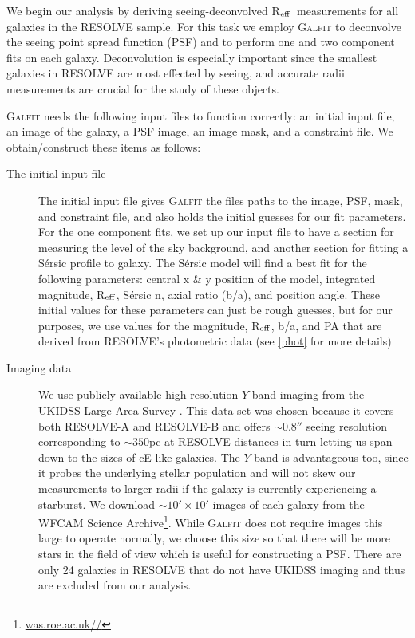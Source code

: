 \documentclass[iop,apj]{emulateapj}
\newcommand{\Reff}{R$_{\rm eff}$}
\begin{document}
\noindent We begin our analysis by deriving seeing-deconvolved \Reff\ measurements for all galaxies in the RESOLVE sample. For this task we employ \textsc{Galfit} \citep{Peng2002} to deconvolve the seeing point spread function (PSF) and to perform one and two component fits on each galaxy. Deconvolution is especially important since the smallest galaxies in RESOLVE are most effected by seeing, and accurate radii measurements are crucial for the study of these objects. 

\textsc{Galfit} needs the following input files to function correctly: an initial input file, an image of the galaxy, a PSF image, an image mask, and a constraint file. We obtain/construct these items as follows:

\begin{description}

\item[The initial input file]{The initial input file gives \textsc{Galfit} the files paths to the image, PSF, mask, and constraint file, and also holds the initial guesses for our fit parameters. For the one component fits, we set up our input file to have a section for measuring the level of the sky background, and another section for fitting a S\'ersic profile to galaxy. The S\'ersic model will find a best fit for the following parameters: central x \& y position of the model, integrated magnitude, \Reff, S\'ersic n, axial ratio (b/a), and position angle. These initial values for these parameters can just be rough guesses, but for our purposes, we use values for the magnitude, \Reff, b/a, and PA that are derived from RESOLVE's photometric data (see \autoref{phot} for more details)}

\item[Imaging data]{We use publicly-available high resolution $Y$-band imaging from the UKIDSS Large Area Survey \citep{Lawrence2007}. This data set was chosen because it covers both RESOLVE-A and RESOLVE-B and offers $\sim0.8''$ seeing resolution corresponding to $\sim350$pc at RESOLVE distances in turn letting us span down to the sizes of cE-like galaxies. The $Y$ band is advantageous too, since it probes the underlying stellar population and will not skew our measurements to larger radii if the galaxy is currently experiencing a starburst. We download $\sim10'\times10'$ images of each galaxy from the WFCAM Science Archive\footnote{\url{was.roe.ac.uk//}}}. While \textsc{Galfit} does not require images this large to operate normally, we choose this size so that there will be more stars in the field of view which is useful for constructing a PSF. There are only 24 galaxies in RESOLVE that do not have UKIDSS imaging and thus are excluded from our analysis.


\end{description}
\end{document}

